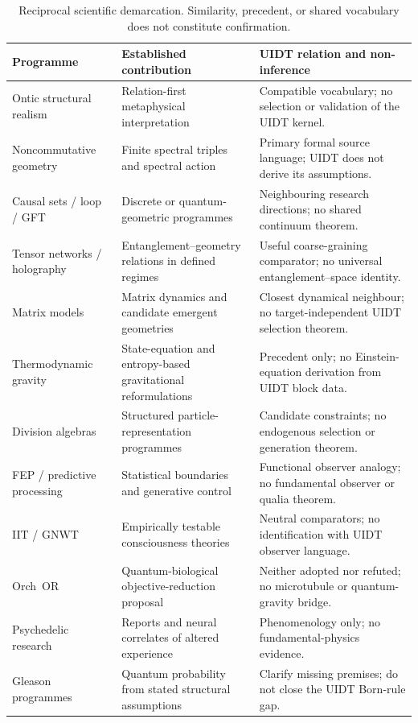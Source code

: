 \documentclass[12pt,a4paper,twoside]{article}
\theoremstyle{plain}
\theoremstyle{definition}
\theoremstyle{remark}
\begin{document}
\begin{table}[H]
\centering
\small
\renewcommand{\arraystretch}{1.22}
\begin{tabular}{@{}p{}p{}p{}@{}}
\toprule
\textbf{Programme} & \textbf{Established contribution} &
\textbf{UIDT relation and non-inference}\\
\midrule
Ontic structural realism & Relation-first metaphysical interpretation &
Compatible vocabulary; no selection or validation of the UIDT kernel.\\
Noncommutative geometry & Finite spectral triples and spectral action &
Primary formal source language; UIDT does not derive its assumptions.\\
Causal sets / loop / GFT & Discrete or quantum-geometric programmes &
Neighbouring research directions; no shared continuum theorem.\\
Tensor networks / holography & Entanglement--geometry relations in defined regimes &
Useful coarse-graining comparator; no universal entanglement--space identity.\\
Matrix models & Matrix dynamics and candidate emergent geometries &
Closest dynamical neighbour; no target-independent UIDT selection theorem.\\
Thermodynamic gravity & State-equation and entropy-based gravitational reformulations &
Precedent only; no Einstein-equation derivation from UIDT block data.\\
Division algebras & Structured particle-representation programmes &
Candidate constraints; no endogenous selection or generation theorem.\\
FEP / predictive processing & Statistical boundaries and generative control &
Functional observer analogy; no fundamental observer or qualia theorem.\\
IIT / GNWT & Empirically testable consciousness theories &
Neutral comparators; no identification with UIDT observer language.\\
Orch~OR & Quantum-biological objective-reduction proposal &
Neither adopted nor refuted; no microtubule or quantum-gravity bridge.\\
Psychedelic research & Reports and neural correlates of altered experience &
Phenomenology only; no fundamental-physics evidence.\\
Gleason programmes & Quantum probability from stated structural assumptions &
Clarify missing premises; do not close the UIDT Born-rule gap.\\
\bottomrule
\end{tabular}
\caption{Reciprocal scientific demarcation. Similarity, precedent, or shared
vocabulary does not constitute confirmation.}
\label{tab:ctx-reciprocal-demarcation}
\end{table}
\end{document}
